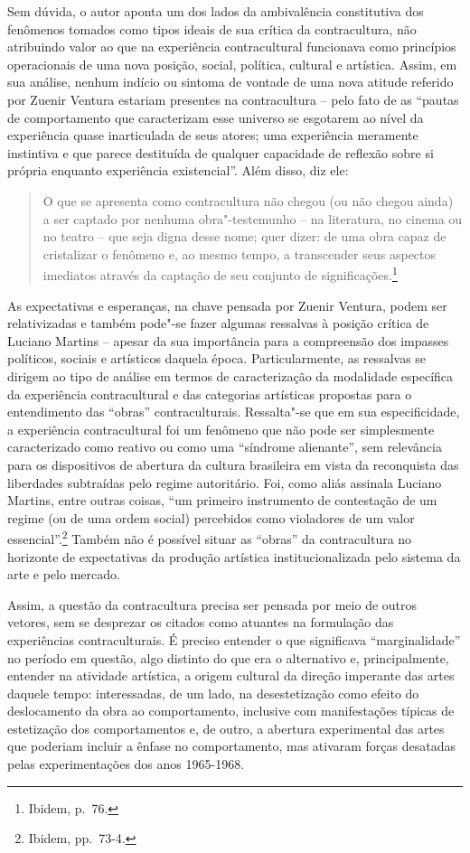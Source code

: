 Sem dúvida, o autor aponta um dos lados da ambivalência constitutiva dos
fenômenos tomados como tipos ideais de sua crítica da contracultura, não
atribuindo valor ao que na experiência contracultural funcionava como
princípios operacionais de uma nova posição, social, política, cultural
e artística. Assim, em sua análise, nenhum indício ou sintoma de vontade
de uma nova atitude referido por Zuenir Ventura estariam presentes na
contracultura -- pelo fato de as ``pautas de comportamento que
caracterizam esse universo se esgotarem ao nível da experiência quase
inarticulada de seus atores; uma experiência meramente instintiva e que
parece destituída de qualquer capacidade de reflexão sobre si própria
enquanto experiência existencial''. Além disso, diz ele:

\begin{quote}
O que se apresenta como contracultura não chegou (ou não chegou ainda) a
ser captado por nenhuma obra"-testemunho -- na literatura, no cinema ou
no teatro -- que seja digna desse nome; quer dizer: de uma obra capaz de
cristalizar o fenômeno e, ao mesmo tempo, a transcender seus aspectos
imediatos através da captação de seu conjunto de
significações.\footnote{Ibidem, p.~76.}
\end{quote}

As expectativas e esperanças, na chave pensada por Zuenir Ventura, podem
ser relativizadas e também pode"-se fazer algumas ressalvas à posição
crítica de Luciano Martins -- apesar da sua importância para a
compreensão dos impasses políticos, sociais e artísticos daquela época.
Particularmente, as ressalvas se dirigem ao tipo de análise em termos de
caracterização da modalidade específica da experiência contracultural e
das categorias artísticas propostas para o entendimento das ``obras''
contraculturais. Ressalta"-se que em sua especificidade, a experiência
contracultural foi um fenômeno que não pode ser simplesmente
caracterizado como reativo ou como uma ``síndrome alienante'', sem
relevância para os dispositivos de abertura da cultura brasileira em
vista da reconquista das liberdades subtraídas pelo regime autoritário.
Foi, como aliás assinala Luciano Martins, entre outras coisas, ``um
primeiro instrumento de contestação de um regime (ou de uma ordem
social) percebidos como violadores de um valor essencial''.\footnote{Ibidem,
pp.~73-4.} Também não é possível situar as ``obras'' da contracultura
no horizonte de expectativas da produção artística institucionalizada
pelo sistema da arte e pelo mercado.

Assim, a questão da contracultura precisa ser pensada por meio de outros
vetores, sem se desprezar os citados como atuantes na formulação das
experiências contraculturais. É preciso entender o que significava
``marginalidade'' no período em questão, algo distinto do que era o alternativo e,
principalmente, entender na atividade artística, a origem cultural da
direção imperante das artes daquele tempo: interessadas, de um lado, na
desestetização como efeito do deslocamento da obra ao comportamento,
inclusive com manifestações típicas de estetização dos comportamentos e,
de outro, a abertura experimental das artes que poderiam
incluir a ênfase no comportamento, mas ativaram forças desatadas pelas
experimentações dos anos 1965-1968.

